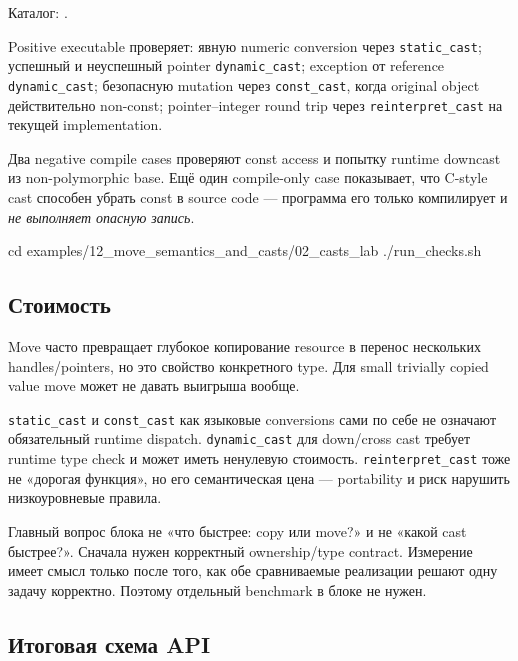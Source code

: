 Каталог:
.

Positive executable проверяет:
явную numeric conversion через \texttt{static\_cast}; успешный и неуспешный pointer \texttt{dynamic\_cast}; exception от reference \texttt{dynamic\_cast}; безопасную mutation через \texttt{const\_cast}, когда original object действительно non-const; pointer--integer round trip через \texttt{reinterpret\_cast} на текущей implementation.

Два negative compile cases проверяют const access и попытку runtime downcast из
non-polymorphic base. Ещё один compile-only case показывает, что C-style cast
способен убрать const в source code --- программа его только компилирует и
\emph{не выполняет опасную запись}.

\begin{shellcode}
cd examples/12_move_semantics_and_casts/02_casts_lab
./run_checks.sh
\end{shellcode}

\subsection{Стоимость}

Move часто превращает глубокое копирование resource в перенос нескольких
handles/pointers, но это свойство конкретного type. Для small trivially copied
value move может не давать выигрыша вообще.

\texttt{static\_cast} и \texttt{const\_cast} как языковые conversions сами по
себе не означают обязательный runtime dispatch.
\texttt{dynamic\_cast} для down/cross cast требует runtime type check и может
иметь ненулевую стоимость.
\texttt{reinterpret\_cast} тоже не «дорогая функция», но его
семантическая цена --- portability и риск нарушить низкоуровневые правила.

\begin{performancebox}
Главный вопрос блока не «что быстрее: copy или move?» и не «какой cast быстрее?».
Сначала нужен корректный ownership/type contract. Измерение имеет смысл только
после того, как обе сравниваемые реализации решают одну задачу корректно.
Поэтому отдельный benchmark в блоке не нужен.
\end{performancebox}

\subsection{Итоговая схема API}

